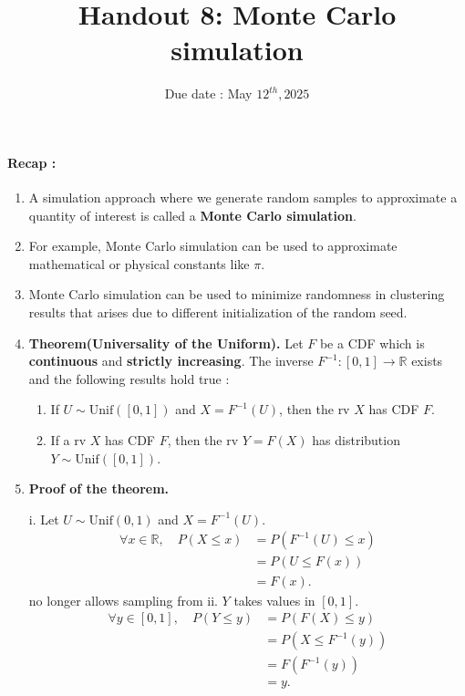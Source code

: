 \documentclass[twocolumn,12pt,a4paper]{article}
\title{ \bfseries \Huge {Handout 8: Monte Carlo simulation}}
\date{\vspace{-2ex}Due date : May $12^{th}, 2025$}%
\newcommand{\R}{\mathbb R}
\newcounter{num}  %
\begin{document}
\maketitle

\thispagestyle{empty} 
\paragraph{Recap :}
\begin{enumerate}
	\item 	A simulation approach where we generate random samples to approximate a quantity of interest is called a
	\textbf{Monte Carlo simulation}.
	
	\item For example, Monte Carlo simulation can be used to approximate mathematical or physical constants like $\pi$.
	
	\item Monte Carlo simulation can be used to minimize randomness in clustering results that arises due to different initialization of the random seed.
	
	\item 
	\textbf{Theorem(Universality of the Uniform).} 
	Let $F$ be a CDF which is \textbf{continuous} and \textbf{strictly increasing}.
	The inverse $F^{-1}:[0, 1]\rightarrow\mathbb{R}$ exists and the following results hold true :
	\begin{enumerate}[label=\roman*.]
		\item   If $U \sim \text{Unif}([0,1])$ and $X = F^{-1}(U)$, then the rv $X$ has CDF $F$.
		\item If a rv $X$ has CDF $F$, then the rv $Y= F(X)$ has distribution $Y\sim \text{Unif}([0,1])$.
	\end{enumerate}
	
	\item 
	\textbf{Proof of the theorem.}
	
	i. Let \( U \sim \text{Unif}(0, 1) \) and \( X = F^{-1}(U) \).
	\[\begin{aligned}
	\forall x\in\R,\quad	P(X \leq x) &= P(F^{-1}(U) \leq x) \\
		&= P(U \leq F(x)) \\
		&= F(x).
	\end{aligned}
	\]no longer allows sampling from
	ii. \( Y \) takes values in \( [0, 1] \).
	$$
	\begin{aligned}
		\forall y\in[0,1],\quad	P(Y \leq y) &= P(F(X) \leq y) \\
		&= P(X \leq F^{-1}(y)) \\
		&= F(F^{-1}(y)) \\
		&= y.
	\end{aligned}
	$$
	

\end{enumerate}
\end{document}
